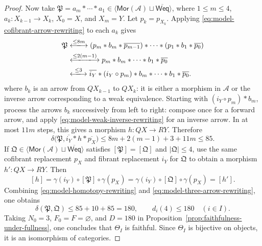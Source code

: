 \documentclass[10pt,a4paper]{amsart}
\theoremstyle{plain}
\theoremstyle{definition}
\theoremstyle{remark}
\begin{document}
\begin{proof}
  Now take $\mathfrak P=a_m\ast\cdots\ast a_1 \in\langle\mathsf{Mor}(\mathcal A)\sqcup\overline{\mathsf{Weq}}\rangle$, where $1\leq m\leq4$, $a_k:X_{k-1}\longrightarrow X_k$, $X_0=X$, and $X_m=Y$.
  Let $p_k=p_{X_k}$.
  Applying \eqref{eq:model-cofibrant-arrow-rewriting} to each $a_k$ gives
  \[
    \begin{aligned}
      \mathfrak P
       & \xlongleftrightarrow{\leq8m}
      (p_m\ast b_m\ast\overline{p_{m-1}})
      \ast\cdots\ast(p_1\ast b_1\ast\overline{p_0})   \\
       & \xlongleftrightarrow{\leq2(m-1)}
      p_m\ast b_m\ast\cdots\ast b_1\ast\overline{p_0} \\
       & \xlongleftrightarrow{\leq3}
      \overline{i_Y}\ast(i_Y\circ p_m)
      \ast b_m\ast\cdots\ast b_1\ast\overline{p_0}.
    \end{aligned}
  \]
  where $b_k$ is an arrow from $QX_{k-1}$ to $QX_k$: it is either a morphism in $\mathcal A$ or the inverse arrow corresponding to a weak equivalence.
  Starting with $(i_Y\circ p_m)\ast b_m$, process the arrows $b_k$ successively from left to right: compose once for a forward arrow, and apply \eqref{eq:model-weak-inverse-rewriting} for an inverse arrow.
  In at most $11m$ steps, this gives a morphism $h:QX\longrightarrow RY$.
  Therefore
  \begin{equation}\label{eq:model-three-arrow-rewriting}
    \delta\bigl(\mathfrak P,
    \overline{i_Y}\ast h\ast\overline{p_X}\bigr)
    \leq8m+2(m-1)+3+11m\leq85.
  \end{equation}
  If $\mathfrak Q\in \langle\mathsf{Mor}(\mathcal A)\sqcup\overline{\mathsf{Weq}}\rangle$ satisfies $[\mathfrak P]=[\mathfrak Q]$ and $|\mathfrak Q|\leq4$, use the same cofibrant replacement $p_X$ and fibrant replacement $i_Y$ for $\mathfrak Q$ to obtain a morphism $h':QX\longrightarrow RY$.
  Then
  \[
    [h]=\gamma(i_Y)\circ[\mathfrak P]\circ\gamma(p_X)
    =\gamma(i_Y)\circ[\mathfrak Q]\circ\gamma(p_X)=[h'].
  \]
  Combining \eqref{eq:model-homotopy-rewriting} and \eqref{eq:model-three-arrow-rewriting}, one obtains
  \[
    \delta(\mathfrak P,\mathfrak Q)\leq85+10+85=180,
    \qquad d_i(4)\leq180\quad(i\in I).
  \]
  Taking $N_0=3$, $F_0=F=\varnothing$, and $D=180$ in Proposition~\ref{prop:faithfulness-under-fullness}, one concludes that $\Theta_I$ is faithful.
  Since $\Theta_I$ is bijective on objects, it is an isomorphism of categories.
\end{proof}
\end{document}
